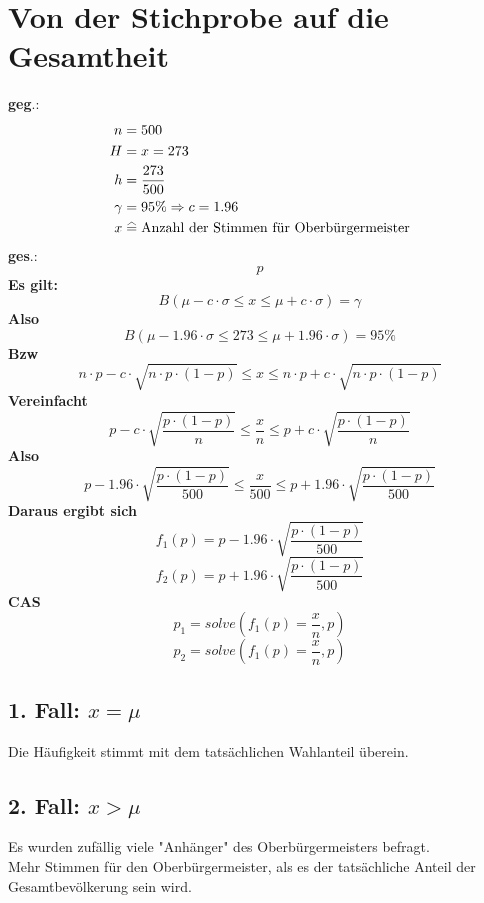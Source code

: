 \documentclass[a4paper,12pt]{article}
\newcommand\equalhat{\mathrel{\stackon[1.5pt]{=}{\stretchto{%
    \scalerel*[\widthof{=}]{\wedge}{\rule{1ex}{3ex}}}{0.5ex}}}}
\begin{document}
\section{Von der Stichprobe auf die Gesamtheit}
\textbf{geg}.:
\begin{equation*}
\begin{split}
n & = 500\\
H & = x = 273\\
h & = \frac{273}{500}\\
\gamma & = 95\% \Rightarrow c = 1.96\\
x & \equalhat \text{Anzahl der Stimmen für Oberbürgermeister}
\end{split}
\end{equation*}
\textbf{ges}.:\\
$$p$$
\textbf{Es gilt:}\\
$$B(\mu - c \cdot \sigma \leq x \leq \mu + c \cdot \sigma) = \gamma$$
\textbf{Also}
$$B(\mu - 1.96 \cdot \sigma \leq 273 \leq \mu + 1.96 \cdot \sigma) = 95\%$$
\textbf{Bzw}\\
$$n \cdot p - c \cdot \sqrt{n \cdot p \cdot (1 - p)} \leq x \leq n \cdot p + c \cdot \sqrt{n \cdot p \cdot (1 - p)}$$
\textbf{Vereinfacht}\\
$$p - c \cdot \sqrt{\frac{p \cdot (1 - p)}{n}} \leq \frac{x}{n} \leq p + c \cdot \sqrt{\frac{p \cdot (1 - p)}{n}}$$
\textbf{Also}\\
$$p - 1.96 \cdot \sqrt{\frac{p \cdot (1 - p)}{500}} \leq \frac{x}{500} \leq p + 1.96 \cdot \sqrt{\frac{p \cdot (1 - p)}{500}}$$
\pagebreak
\textbf{Daraus ergibt sich}\\
$$f_{1}(p) = p - 1.96 \cdot \sqrt{\frac{p \cdot (1 - p)}{500}}$$
$$f_{2}(p) = p + 1.96 \cdot \sqrt{\frac{p \cdot (1 - p)}{500}}$$
\textbf{CAS}\\
$$p_{1} = solve(f_{1}(p) = \frac{x}{n}, p)$$
$$p_{2} = solve(f_{1}(p) = \frac{x}{n}, p)$$
\subsection*{1. Fall: $x = \mu$}
Die Häufigkeit stimmt mit dem tatsächlichen Wahlanteil überein.\\
\subsection*{2. Fall: $x > \mu$}
Es wurden zufällig viele "Anhänger" des Oberbürgermeisters befragt.\\
Mehr Stimmen für den Oberbürgermeister, als es der tatsächliche Anteil der Gesamtbevölkerung sein wird.\\
\end{document}
